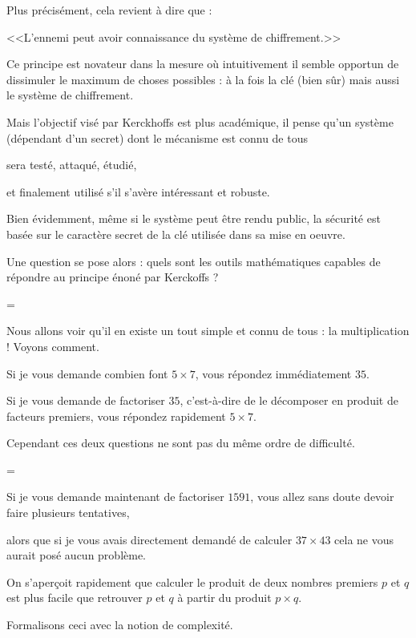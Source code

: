 \change

Plus précisément, cela revient à dire que : 

\centerline{<<L'ennemi peut avoir connaissance du système de chiffrement.>>}

\change
Ce principe est novateur dans la mesure 
où intuitivement il semble opportun de dissimuler le maximum 
de choses possibles : à la fois la clé (bien sûr) mais aussi le système de chiffrement. 

\change
Mais l'objectif visé par Kerckhoffs est plus académique, 
il pense qu'un système (dépendant d'un secret) dont 
le mécanisme est connu de tous 

sera testé, attaqué, étudié, 

et finalement utilisé s'il s'avère intéressant et robuste.

\change
Bien évidemment, même si le système peut être rendu public, 
la sécurité est basée sur le caractère secret de la clé utilisée dans sa mise en oeuvre.


\diapo


Une question se pose alors : quels sont les outils mathématiques capables de répondre au principe énoné par Kerckoffs ?

=

Nous allons voir qu'il en existe un tout simple et connu de tous : la multiplication ! Voyons comment.

\change

Si je vous demande combien font $5\times7$, vous répondez immédiatement $35$.

\change
Si je vous demande de factoriser $35$, c'est-à-dire de le décomposer en produit de facteurs premiers, vous répondez rapidement $5\times 7$.

\change
Cependant ces deux questions ne sont pas du même ordre de difficulté.

=

Si je vous demande maintenant de factoriser $1591$, vous allez sans doute devoir faire plusieurs tentatives,

\change
alors que si je vous avais directement demandé de calculer $37\times 43$ cela ne vous aurait posé aucun problème.

\change
On s'aperçoit rapidement que calculer le produit de deux nombres premiers $p$ et $q$ est plus facile que retrouver 
$p$ et $q$ à partir du produit $p \times q$.

\change
Formalisons ceci avec la notion de complexité.

